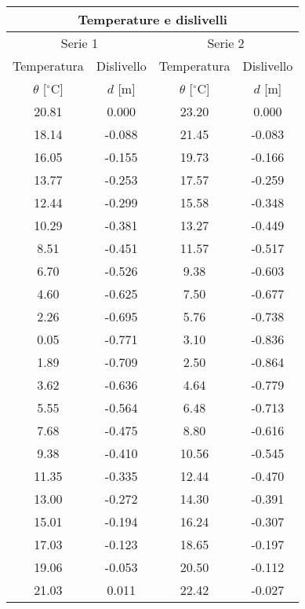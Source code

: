 \begin{SCtable}
    \centering
    \begin{tabular}{c c | c c}
        \multicolumn{4}{c}{\textbf{Temperature e dislivelli}} \\
        \toprule
        \multicolumn{2}{c}{Serie 1} & \multicolumn{2}{c}{Serie 2} \\

        Temperatura & Dislivello  & Temperatura & Dislivello  \\  
        $\theta$ [$^\circ$C] & $d$ [m] & $\theta$ [$^\circ$C] & $d$ [m] \\ 
        \midrule
            20.81 &  0.000  & 23.20 &  0.000  \\
            18.14 & -0.088  & 21.45 & -0.083  \\
            16.05 & -0.155  & 19.73 & -0.166  \\
            13.77 & -0.253  & 17.57 & -0.259  \\
            12.44 & -0.299  & 15.58 & -0.348  \\
            10.29 & -0.381  & 13.27 & -0.449  \\
            8.51  & -0.451  & 11.57 & -0.517  \\
            6.70  & -0.526  & 9.38  & -0.603  \\
            4.60  & -0.625  & 7.50  & -0.677  \\
            2.26  & -0.695  & 5.76  & -0.738  \\
            0.05  & -0.771  & 3.10  & -0.836  \\
            1.89  & -0.709  & 2.50  & -0.864  \\
            3.62  & -0.636  & 4.64  & -0.779  \\
            5.55  & -0.564  & 6.48  & -0.713  \\
            7.68  & -0.475  & 8.80  & -0.616  \\
            9.38  & -0.410  & 10.56 & -0.545  \\
            11.35 & -0.335  & 12.44 & -0.470  \\
            13.00 & -0.272  & 14.30 & -0.391  \\
            15.01 & -0.194  & 16.24 & -0.307  \\
            17.03 & -0.123  & 18.65 & -0.197  \\
            19.06 & -0.053  & 20.50 & -0.112  \\
            21.03 &  0.011  & 22.42 & -0.027  \\

\end{tabular}
\end{SCtable}
